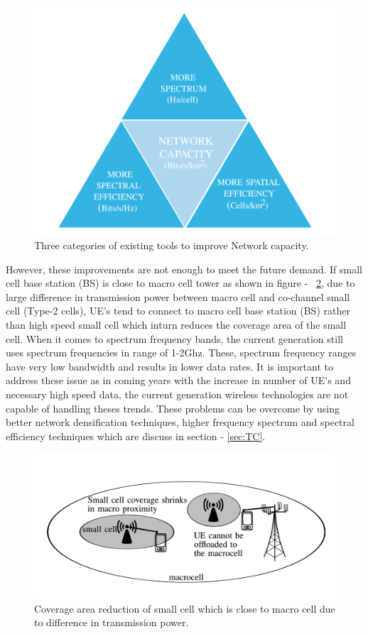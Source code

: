 \documentclass[12pt,onecolumn]{IEEEtran}
\begin{document}
\begin{figure}[ht]
\includegraphics[scale=0.3]{nwcp_class}
\centering
\caption{Three categories of existing tools to improve Network capacity.~\cite{main_paper}}
\label{fig:NWCP}
\end{figure}
However, these improvements are not enough to meet the future demand. If small cell base station (BS) is close to macro cell tower as shown in figure - ~\ref{fig:SMI}, due to large difference in transmission power between macro cell and co-channel small cell (Type-2 cells), UE's tend to connect to macro cell base station (BS) rather than high speed small cell which inturn reduces the coverage area of the small cell. When it comes to spectrum frequency bands, the current generation still uses spectrum frequencies in range of 1-2Ghz. These, spectrum frequency ranges have very low bandwidth and results in lower data rates.
It is important to address these issue as in coming years with the increase in number of UE's and necessary high speed data, the current generation wireless technologies are not capable of handling theses trends. These problems can be overcome by using better network densification techniques, higher frequency spectrum and spectral efficiency techniques which are discuss in section - \ref{sec:TC}.

\begin{figure}[ht]
\includegraphics[scale=0.4]{sm_inter}
\centering
\caption{Coverage area reduction of small cell which is close to macro cell due to difference in transmission power.~\cite{main_paper}}
\label{fig:SMI}
\end{figure}
\end{document}
